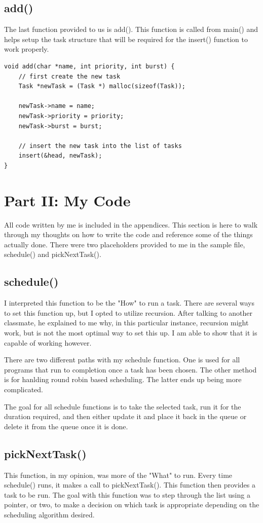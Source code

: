 \documentclass[10pt]{article}
\begin{document}
\subsection{add()}
The last function provided to us is add().  This function is called from main() and helps setup the task structure that will be required for the insert() function to work properly. 

\begin{verbatim}
void add(char *name, int priority, int burst) {
    // first create the new task
    Task *newTask = (Task *) malloc(sizeof(Task));
    
    newTask->name = name;
    newTask->priority = priority;
    newTask->burst = burst;
	
    // insert the new task into the list of tasks 
    insert(&head, newTask);
}
\end{verbatim}
\section{Part II: My Code}
All code written by me is included in the appendices.  This section is here to walk through my thoughts on how to write the code and reference some of the things actually done.  There were two placeholders provided to me in the sample file, schedule() and pickNextTask().

\subsection{schedule()}
I interpreted this function to be the "How" to run a task.  There are several ways to set this function up, but I opted to utilize recursion.  After talking to another classmate, he explained to me why, in this particular instance, recursion might work, but is not the most optimal way to set this up.  I am able to show that it is capable of working however.  

There are two different paths with my schedule function.  One is used for all programs that run to completion once a task has been chosen.  The other method is for hanlding round robin based scheduling.  The latter ends up being more complicated.

The goal for all schedule functions is to take the selected task, run it for the duration required, and then either update it and place it back in the queue or delete it from the queue once it is done.

\subsection{pickNextTask()}
This function, in my opinion, was more of the "What" to run.  Every time schedule() runs, it makes a call to pickNextTask().  This function then provides a task to be run.  The goal with this function was to step through the list using a pointer, or two, to make a decision on which task is appropriate depending on the scheduling algorithm desired.
\end{document}
